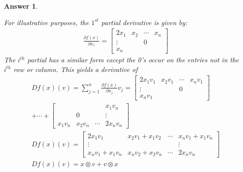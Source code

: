 \documentclass[12pt]{article}
\theoremstyle{colon}
\newtheorem*{answer}{Answer}
\begin{document}
\begin{answer}
\begin{enumerate}[label=\alph*)]
      For illustrative purposes, the $1^{st}$ partial derivative is given by:
      \begin{gather*}
        \frac{\partial f(x)}{\partial x_1} = \begin{bmatrix} 2 x_1 & x_2 & \dotsm & x_n \\ \vdots & & 0 & \\ x_n & & & \end{bmatrix}
      \end{gather*}
      The $i^{th}$ partial has a similar form except the 0's occur on the entries not in the $i^{th}$ row or column. This yields a derivative of
      \begin{gather*}
        D f(x)(v) = \sum_{j=1}^n \frac{\partial f(x)}{\partial x_j} v_j = \begin{bmatrix} 2 x_1 v_1 & x_2 v_1 & \dotsm & x_n v_1 \\ \vdots & & 0 & \\ x_n v_1 & & & \end{bmatrix} \\
        + \dotsm + \begin{bmatrix} & & & x_1 v_n \\ & 0 & & \vdots \\ x_1 v_n & x_2 v_n & \dotsm & 2 x_n v_n \end{bmatrix} \\
        D f(x)(v) = \begin{bmatrix} 2 x_1 v_1 & x_2 v_1 + x_1 v_2 & \dotsm & x_n v_1 + x_1 v_n \\ \vdots & & & \vdots \\ x_n v_1 + x_1 v_n & x_n v_2 + x_2 v_n & \dotsm & 2 x_n v_n \end{bmatrix} \\
        D f(x)(v) = x \otimes v + v \otimes x
      \end{gather*}
  \end{enumerate}
\end{answer}

\clearpage
\end{document}
